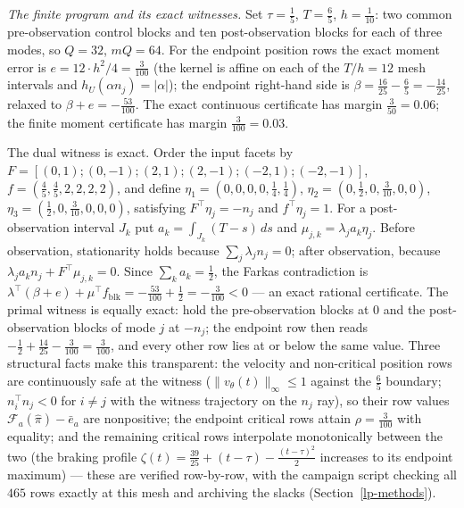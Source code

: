 \documentclass[10pt,twocolumn]{article}
\theoremstyle{plain}
\theoremstyle{definition}
\theoremstyle{remark}
\begin{document}
\emph{The finite program and its exact witnesses.} Set
\(\tau = \tfrac15\), \(T = \tfrac65\), \(h = \tfrac1{10}\): two common
pre-observation control blocks and ten post-observation blocks for each of
three modes, so \(Q = 32\), \(mQ = 64\). For the endpoint position rows the
exact moment error is \(e = 12 \cdot h^2/4 = \tfrac{3}{100}\) (the kernel is
affine on each of the \(T/h = 12\) mesh intervals and
\(h_U(\alpha n_j) = |\alpha|\)); the endpoint right-hand side is
\(\beta = \tfrac{16}{25} - \tfrac65 = -\tfrac{14}{25}\), relaxed to
\(\beta + e = -\tfrac{53}{100}\). The exact continuous certificate has
margin \(\tfrac{3}{50} = 0.06\); the finite moment certificate has margin
\(\tfrac{3}{100} = 0.03\).

The dual witness is exact. Order the input facets by
\(F = [(0,1);(0,-1);(2,1);(2,-1);(-2,1);(-2,-1)]\),
\(f = (\tfrac45, \tfrac45, 2, 2, 2, 2)\), and define
\(\eta_1 = (0,0,0,0,\tfrac14,\tfrac14)\),
\(\eta_2 = (0,\tfrac12,0,\tfrac3{10},0,0)\),
\(\eta_3 = (\tfrac12,0,\tfrac3{10},0,0,0)\), satisfying
\(F^\top \eta_j = -n_j\) and \(f^\top \eta_j = 1\). For a post-observation
interval \(J_k\) put \(a_k = \int_{J_k} (T - s)\, ds\) and
\(\mu_{j,k} = \lambda_j a_k \eta_j\). Before observation, stationarity holds
because \(\sum_j \lambda_j n_j = 0\); after observation, because
\(\lambda_j a_k n_j + F^\top \mu_{j,k} = 0\). Since
\(\sum_k a_k = \tfrac12\), the Farkas contradiction is
\(\lambda^\top(\beta + e) + \mu^\top f_{\mathrm{blk}} = -\tfrac{53}{100} +
\tfrac12 = -\tfrac{3}{100} < 0\) --- an exact rational certificate. The
primal witness is equally exact: hold the pre-observation blocks at \(0\) and
the post-observation blocks of mode \(j\) at \(-n_j\); the endpoint row then
reads \(-\tfrac12 + \tfrac{14}{25} - \tfrac{3}{100} = \tfrac{3}{100}\), and
every other row lies at or below the same value. Three structural facts
make this transparent: the velocity and non-critical position rows are
continuously safe at the witness (\(\|v_\theta(t)\|_\infty \le 1\)
against the \(\tfrac65\) boundary; \(n_i^\top n_j < 0\) for
\(i \ne j\) with the witness trajectory on the \(n_j\) ray), so their
row values \(\mathcal F_a(\hat\pi) - \bar e_a\) are nonpositive; the
endpoint critical rows attain \(\rho = \tfrac3{100}\) with equality; and
the remaining critical rows interpolate monotonically between the two
(the braking profile \(\zeta(t) = \tfrac{39}{25} + (t - \tau) -
\tfrac{(t-\tau)^2}{2}\) increases to its endpoint maximum) --- these are
verified row-by-row, with the campaign script checking all \(465\) rows
exactly at this mesh and archiving the slacks
(Section~\ref{lp-methods}).
\end{document}
